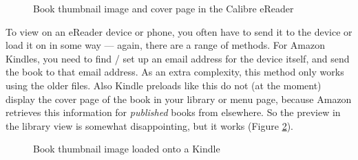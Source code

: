 \begin{figure}
\begin{center}
\caption{Book thumbnail image and cover page in the Calibre eReader}
\label{fig:calibre_screenshot}
\end{center}
\end{figure}

To view on an eReader device or phone, you often have to send it to
the device or load it on in some way --- again, there are a range of
methods. For Amazon Kindles, you need to find / set up an email address for the
device itself, and send the book to that email address. As an extra
complexity, this method only works using the older 
files.  Also Kindle preloads like this do not (at the moment)
display the cover page of the book in your library or menu page,
because Amazon retrieves this information for {\em published} books
from elsewhere. So the preview in the library view is somewhat
disappointing, but it works (Figure \ref{fig:kindle_screenshot}).

\begin{figure}
\begin{center}
  \caption{Book thumbnail image loaded onto a Kindle}
  \label{fig:kindle_screenshot}
 \end{center}
\end{figure}

